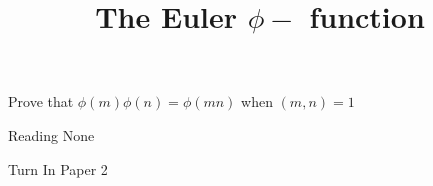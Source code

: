 \documentclass{ximera}
\title{The Euler $\phi-$ function}
\begin{document}
\begin{abstract}
\end{abstract}
\maketitle


\begin{obj}
  \item Prove that $\phi(m)\phi(n)=\phi(mn)$ when $(m,n)=1$
\end{obj}


\begin{pre}
    \item[Reading] None
    \item[Turn In] Paper 2
\end{pre}
\end{document}

